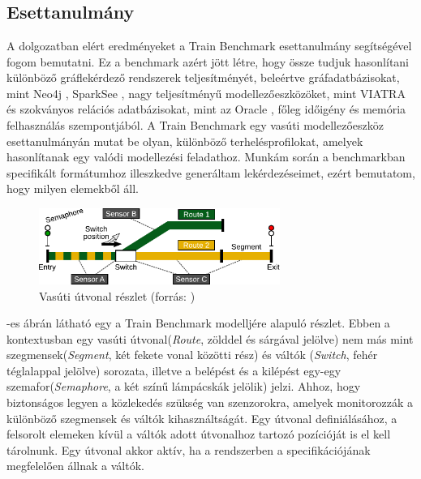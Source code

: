 \chapter{\eloismeretek}

\section{Esettanulmány}
A dolgozatban elért eredményeket a Train Benchmark \cite{szarnyas2018train} esettanulmány segítségével fogom bemutatni. Ez a benchmark azért jött létre, hogy össze tudjuk hasonlítani különböző gráflekérdező rendszerek teljesítményét, beleértve gráfadatbázisokat, mint Neo4j \cite{neo4j},  SparkSee \cite{sparksee}, nagy teljesítményű modellezőeszközöket, mint VIATRA \cite{viatra} és szokványos relációs adatbázisokat, mint az Oracle \cite{oracle}, főleg időigény és memória felhasználás szempontjából. A Train Benchmark egy vasúti modellezőeszköz esettanulmányán mutat be olyan, különböző terhelésprofilokat, amelyek hasonlítanak egy valódi modellezési feladathoz. Munkám során a benchmarkban specifikált formátumhoz illeszkedve generáltam lekérdezéseimet, ezért bemutatom, hogy milyen elemekből áll. 

\begin{figure}
	\centering
	\includegraphics[width=0.7\textwidth]{figures/trainbenchmarkfig1}
	\caption{Vasúti útvonal részlet (forrás: \cite{szarnyas2018train})}
	\label{fig:trainbenchmark}
\end{figure}

-es ábrán látható egy a Train Benchmark modelljére alapuló részlet.
Ebben a kontextusban egy vasúti útvonal(\textit{Route}, zölddel és sárgával jelölve) nem más mint szegmensek(\textit{Segment}, két fekete vonal közötti rész) és váltók (\textit{Switch}, fehér téglalappal jelölve) sorozata, illetve a belépést és a kilépést egy-egy szemafor(\textit{Semaphore}, a két színű lámpácskák jelölik) jelzi. Ahhoz, hogy biztonságos legyen a közlekedés szükség van szenzorokra, amelyek monitorozzák a különböző szegmensek és váltók kihasználtságát. Egy útvonal definiálásához, a felsorolt elemeken kívül a váltók adott útvonalhoz tartozó pozícióját is el kell tárolnunk. Egy útvonal akkor aktív, ha a rendszerben a specifikációjának megfelelően állnak a váltók.




